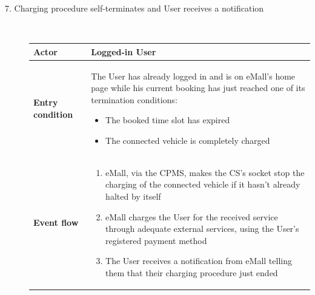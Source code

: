 \documentclass[11pt]{article}
\begin{document}
\begin{description}
    \item [7. Charging procedure self-terminates and User receives a notification] \hfill \\
    \begin{table}[H]
        \centering
        \setlength{\tabcolsep}{18pt}
        \renewcommand{\arraystretch}{1.4}
        \begin{tabularx}{\textwidth}{|>{\hsize=0.5\hsize}X|>{\hsize=1.5\hsize}X|}
            \hline
            \textbf{Actor} & Logged-in User \\
            \hline
            \textbf{Entry condition} & The User has already logged in and is on eMall's home page while his current booking has just reached one of its termination conditions:
            \begin{minipage}[t]{\hsize}
            \begin{itemize}
                \item The booked time slot has expired
                \item The connected vehicle is completely charged
            \end{itemize}
            \end{minipage}
            \vspace{6pt}
            \\
            \hline
            \textbf{Event flow} & 
                \begin{minipage}[t]{\hsize}
                \begin{enumerate}[topsep=0pt, leftmargin=*]
                    \item eMall, via the CPMS, makes the CS's socket stop the charging of the connected vehicle if it hasn't already halted by itself
                    \item eMall charges the User for the received service through adequate external services, using the User’s registered payment method
                    \item The User receives a notification from eMall telling them that their charging procedure just ended
                \end{enumerate}
                \end{minipage}
                \vspace{6pt}
            \\
            \hline

\end{tabularx}
\end{table}
\end{description}
\end{document}

